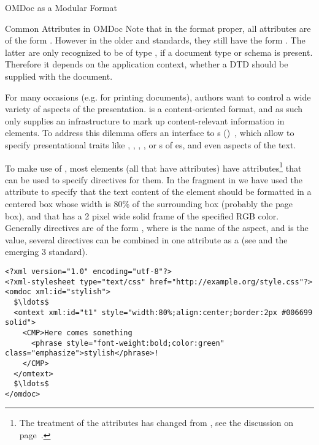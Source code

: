\begin{tchapter}[id=spec-intro]{OMDoc as a Modular Format}
\begin{tsection}[id=common-attribs]{Common Attributes in OMDoc}
  Note that in the {\omdoc} format proper, all {} attributes are of the
  form {}. However in the older {\openmath} and {\mathml}
  standards, they still have the form {}. The latter are only
  recognized to be of type {}, if a document type or {\xml}schema is
  present. Therefore it depends on the application context, whether a DTD should be
  supplied with the {\omdoc} document.
  
  For many occasions (e.g. for printing {\omdoc} documents), authors want to control a
  wide variety of aspects of the presentation. {\omdoc} is a content-oriented format, and
  as such only supplies an infrastructure to mark up content-relevant information in
  {\omdoc} elements. To address this dilemma {\xml} offers an interface to 
  {s} ({\css})~\cite{BosHak:css98}, which allow to specify
  presentational traits like {}, {},
  {}, {}, or {s} of
  {es}, and even {} aspects of the text.
  
  To make use of {\css}, most {\omdoc} elements (all that have
  {} attributes) have {}
  attributes\footnote{The treatment of the {\css} attributes has changed from
    {}, see the discussion on
    page~\pageref{style/class-comment}.} that can be used to specify
  {\css} directives for them. In the {\omdoc} fragment in
  {} we have used the {} attribute to specify
  that the text content of the {} element should be formatted in a
  centered box whose width is 80\% of the surrounding box (probably the page box), and
  that has a 2 pixel wide solid frame of the specified RGB color. Generally {\css}
  directives are of the form {}, where {} is the name of the
  aspect, and {} is the value, several {\css} directives
  can be combined in one {} attribute as a
  {} (see {\cite{BosHak:css98} and the emerging {\css}
    3} standard).

\begin{lstlisting}[label=lst:css-basic,mathescape,
   caption={Basic {\css} Directives in a {\attributeshort{style}} Attribute},
   index={style,class}]
<?xml version="1.0" encoding="utf-8"?>
<?xml-stylesheet type="text/css" href="http://example.org/style.css"?>
<omdoc xml:id="stylish">
  $\ldots$
  <omtext xml:id="t1" style="width:80%;align:center;border:2px #006699 solid">
    <CMP>Here comes something 
      <phrase style="font-weight:bold;color:green" class="emphasize">stylish</phrase>!
    </CMP>
  </omtext>
  $\ldots$
</omdoc>
\end{lstlisting}


\end{tsection}
\end{tchapter}
